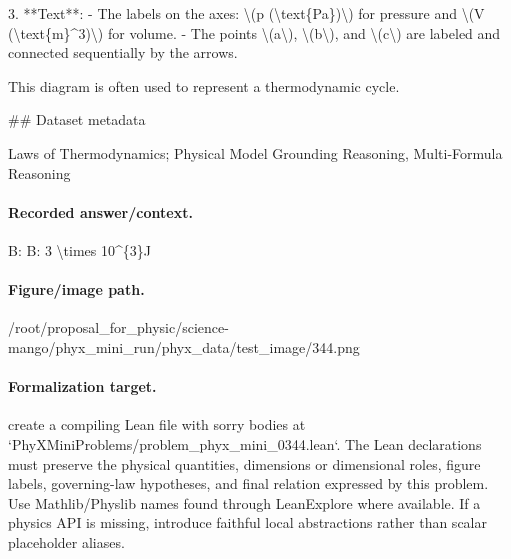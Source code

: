 3. **Text**: 
   - The labels on the axes: \textbackslash{}(p (\textbackslash{}text\{Pa\})\textbackslash{}) for pressure and \textbackslash{}(V (\textbackslash{}text\{m\}\textasciicircum{}3)\textbackslash{}) for volume.
   - The points \textbackslash{}(a\textbackslash{}), \textbackslash{}(b\textbackslash{}), and \textbackslash{}(c\textbackslash{}) are labeled and connected sequentially by the arrows.

This diagram is often used to represent a thermodynamic cycle.

\#\# Dataset metadata

Laws of Thermodynamics; Physical Model Grounding Reasoning, Multi-Formula Reasoning

\paragraph{Recorded answer/context.}
B: B: 3 \textbackslash{}times 10\textasciicircum{}\{3\}J

\paragraph{Figure/image path.}
/root/proposal\_for\_physic/science-mango/phyx\_mini\_run/phyx\_data/test\_image/344.png

\paragraph{Formalization target.}
create a compiling Lean file with sorry bodies at `PhyXMiniProblems/problem\_phyx\_mini\_0344.lean`. The Lean declarations must preserve the physical quantities, dimensions or dimensional roles, figure labels, governing-law hypotheses, and final relation expressed by this problem.
Use Mathlib/Physlib names found through LeanExplore where available. If a physics API is missing, introduce faithful local abstractions rather than scalar placeholder aliases.

